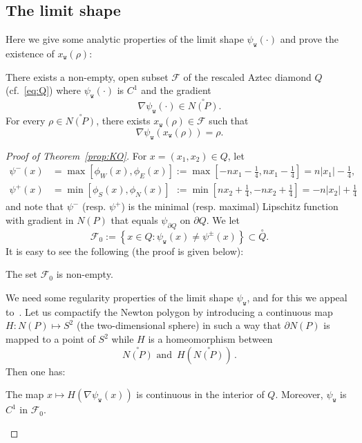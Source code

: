\documentclass[AHL,Unicode,longabstracts,published]{cedram}
\newcommand{\ttw}{\mathtt{w}}
\newcommand{\clF}{\mathcal{F}}
\newcommand{\ttw}{\mathtt{w}}
\begin{document}
\subsection{The limit shape}
Here we give some analytic properties of the limit shape $\psi_{\ttw}(\cdot)$ and prove the existence of $x_{\ttw}(\rho)$:
\begin{theo}\label{prop:KO}
There exists a non-empty, open subset $\clF$ of the rescaled Aztec diamond $Q$ (cf.~\eqref{eq:Q}) where $\psi_{\ttw}(\cdot)$ is $C^1$ and the gradient
\[\nabla \psi_{\ttw}(\cdot)\in \stackrel \circ{ N(P)}.
\]
For every $\rho\in \stackrel\circ{N(P)}$, there exists $x_{\ttw}(\rho)\in \clF$ such that
\[
\nabla \psi_{\ttw}(x_{\ttw}(\rho))=\rho.
\]
\end{theo}



\begin{proof}[Proof of Theorem~\ref{prop:KO}]
For $x=(x_1,x_2)\in Q$, let
\begin{equation}\label{eq:minmax}
\begin{aligned}
\psi^-(x) &=\max\left[\phi_W(x),\phi_E(x)\right] :=\max\left[-n x_1-\frac14, n{x_1}-\frac14\right] =n{|x_1|}-\frac14,\\
\psi^+(x) &=\min\left[\phi_S(x),\phi_N(x)\right]\:\,:=\min\left[n{x_2}+\frac14,-n{x_2}+\frac14\right] =-n{|x_2|}+\frac14
\end{aligned}
\end{equation}
and note that $\psi^-$ (resp. $\psi^+$) is the minimal (resp. maximal) Lipschitz function with gradient in $N(P)$ that equals $\psi_{\partial Q}$ on $\partial Q.$ We let
\begin{equation}\label{eq:mathcalF}
\clF_0:=\left\{x\in Q: \psi_{\ttw}(x)\ne \psi^\pm(x)\right\}\subset \stackrel \circ Q.
\end{equation}
It is easy to see the following (the proof is given below):
\begin{lemm}\label{lemma:pro}
The set $\clF_0$ is non-empty.
\end{lemm}

We need some regularity properties of the limit shape $\psi_{\ttw}$, and for this we appeal to~\cite{Duse,SS10}. Let us compactify the Newton polygon by introducing a continuous map $H:N(P)\mapsto S^2$ (the two-dimensional sphere) in such a way that $\partial N(P)$ is mapped to a point of $S^2$ while $H$ is a homeomorphism between
\[
\stackrel\circ{N(P)}\text{ and }\,H(\stackrel\circ{N(P)})\,.
\]
Then one has:

\begin{prop}
The map $x\mapsto H(\nabla\psi_{\ttw}(x))$ is continuous in the interior of $Q$. Moreover, $\psi_{\ttw}$ is $C^1$ in $\clF_0$.
\end{prop}



\end{proof}
\end{document}
